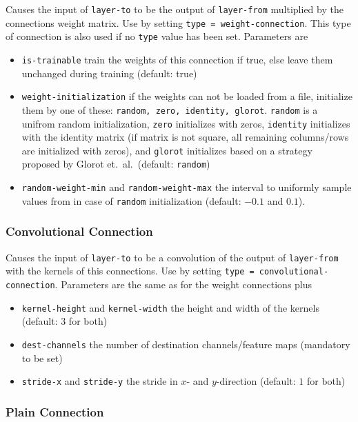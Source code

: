 Causes the input of \texttt{layer-to} to be the output of \texttt{layer-from} multiplied by the connections weight matrix. Use by setting \texttt{type = weight-connection}. This type of connection is also used if no \texttt{type} value has been set. Parameters are
\begin{itemize}
    \item \texttt{is-trainable} train the weights of this connection if true, else leave them unchanged during training (default: true)
    \item \texttt{weight-initialization} if the weights can not be loaded from a file, initialize them by one of these: \texttt{random, zero, identity, glorot}. \texttt{random} is a unifrom random initialization, \texttt{zero} initializes with zeros, \texttt{identity} initializes with the identity matrix (if matrix is not square, all remaining columns/rows are initialized with zeros), and \texttt{glorot} initializes based on a strategy proposed by Glorot et.\ al.\ (default: \texttt{random})
    \item \texttt{random-weight-min} and \texttt{random-weight-max} the interval to uniformly sample values from in case of \texttt{random} initialization (default: $ -0.1 $ and $ 0.1 $).
\end{itemize}

\subsubsection*{Convolutional Connection}

Causes the input of \texttt{layer-to} to be a convolution of the output of \texttt{layer-from} with the kernels of this connections. Use by setting \texttt{type = convolutional-connection}. Parameters are the same as for the weight connections plus
\begin{itemize}
    \item \texttt{kernel-height} and \texttt{kernel-width} the height and width of the kernels (default: $ 3 $ for both)
    \item \texttt{dest-channels} the number of destination channels/feature maps (mandatory to be set)
    \item \texttt{stride-x} and \texttt{stride-y} the stride in $ x $- and $ y $-direction (default: $ 1 $ for both)
\end{itemize}

\subsubsection*{Plain Connection}

